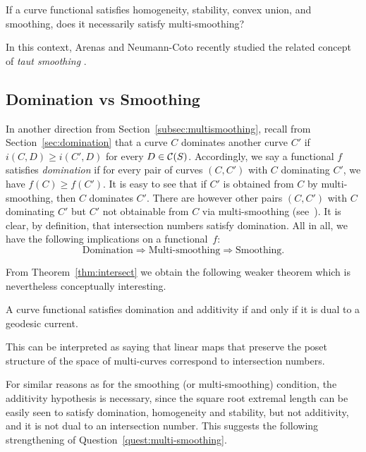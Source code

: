 \begin{question}\label{quest:multi-smoothing}
If a curve functional satisfies homogeneity, stability, convex union,
and smoothing, does it necessarily satisfy multi-smoothing?
\end{question}

In this context, Arenas and Neumann-Coto
recently studied the related concept of \emph{taut smoothing}  \cite{ANC24:TautSmoothings}.

\subsection{Domination vs Smoothing}
\label{subsec:domination}
In another direction from Section~\ref{subsec:multismoothing},
recall from Section~\ref{sec:domination} that a curve $C$ dominates another curve $C'$ if $i(C,D) \geq
i(C',D)$ for every $D \in \mathcal{C}(S)$. Accordingly, we say a functional $f$ satisfies
\emph{domination} if for
every pair of curves $(C,C')$ with $C$ dominating $C'$, we have
$f(C) \geq f(C')$.
It is easy to see that if $C'$ is obtained from $C$ by
multi-smoothing, then $C$ dominates $C'$. There are however other
pairs $(C,C')$ with $C$ dominating $C'$ but $C'$ not obtainable from
$C$ via multi-smoothing
(see~\cite[Example]{NC01:ShortestGeodesics}).
It is clear, by definition, that intersection numbers satisfy domination.
All in all, we have the following implications on a functional~$f$:
\[
  \text{Domination} \Rightarrow \text{Multi-smoothing} \Rightarrow \text{Smoothing}.
\]

From Theorem~\ref{thm:intersect} we obtain the following weaker
theorem which is nevertheless conceptually interesting.

\begin{theorem}
A curve functional satisfies domination and additivity if and only if it is dual to a geodesic current.
\end{theorem}

This can be interpreted as saying that linear maps that preserve the poset structure of the space of multi-curves correspond to intersection numbers.

For similar reasons as for the smoothing (or multi-smoothing)
condition, the additivity hypothesis is necessary, since
the square
root extremal length can be easily seen to satisfy domination,
homogeneity and stability, but not additivity, and it is not dual to
an intersection number.
This suggests the following strengthening of
Question~\ref{quest:multi-smoothing}.

